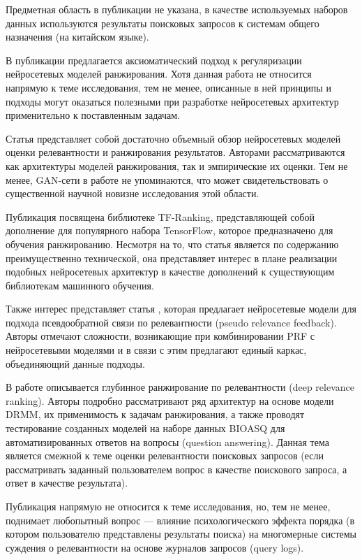 Предметная область в публикации не указана, в качестве используемых наборов данных используются результаты поисковых запросов к
системам общего назначения (на китайском языке).

В публикации \cite{DBLP:journals/corr/abs-1904-06808} предлагается аксиоматический подход к регуляризации нейросетевых моделей 
ранжирования. Хотя данная работа не относится напрямую к теме исследования, тем не менее, описанные в ней принципы и подходы 
могут оказаться полезными при разработке нейросетевых архитектур применительно к поставленным задачам.

Статья \cite{DBLP:journals/corr/abs-1903-06902} представляет собой достаточно объемный обзор нейросетевых моделей оценки 
релевантности и ранжирования результатов. Авторами рассматриваются как архитектуры моделей ранжирования, так и эмпирические
их оценки. Тем не менее, GAN-сети в работе не упоминаются, что может свидетельствовать о существенной научной новизне
исследования этой области.

Публикация \cite{DBLP:journals/corr/abs-1812-00073} посвящена библиотеке TF-Ranking, представляющей собой дополнение для 
популярного набора TensorFlow, которое предназначено для обучения ранжированию. Несмотря на то, что статья является 
по содержанию преимущественно технической, она представляет интерес в плане реализации подобных нейросетевых архитектур 
в качестве дополнений к существующим библиотекам машинного обучения.

Также интерес представляет статья \cite{DBLP:journals/corr/abs-1810-12936}, которая предлагает нейросетевые модели 
для подхода псевдообратной связи по релевантности (pseudo relevance feedback). Авторы отмечают сложности, возникающие при
комбинировании PRF с нейросетевыми моделями и в связи с этим предлагают единый каркас, объединяющий данные подходы.

В работе \cite{DBLP:journals/corr/abs-1809-01682} описывается глубинное ранжирование по релевантности (deep relevance ranking).
Авторы подробно рассматривают ряд архитектур на основе модели DRMM, их применимость к задачам ранжирования, а также проводят
тестирование созданных моделей на наборе данных BIOASQ для автоматизированных ответов на вопросы (question answering).
Данная тема является смежной к теме оценки релевантности поисковых запросов (если рассматривать заданный пользователем
вопрос в качестве поискового запроса, а ответ в качестве результата).

Публикация \cite{DBLP:journals/corr/abs-1807-05355} напрямую не относится к теме исследования, но, тем не менее, поднимает
любопытный вопрос — влияние психологического эффекта порядка (в котором пользователю представлены результаты поиска)
на многомерные системы суждения о релевантности на основе журналов запросов (query logs).

